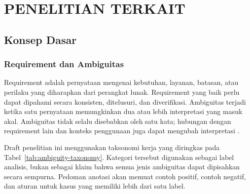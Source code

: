 \chapter{PENELITIAN TERKAIT}

\section{Konsep Dasar}

\subsection{Requirement dan Ambiguitas}

Requirement adalah pernyataan mengenai kebutuhan, layanan, batasan, atau perilaku yang diharapkan dari perangkat lunak. Requirement yang baik perlu dapat dipahami secara konsisten, ditelusuri, dan diverifikasi. Ambiguitas terjadi ketika satu pernyataan memungkinkan dua atau lebih interpretasi yang masuk akal. Ambiguitas tidak selalu disebabkan oleh satu kata; hubungan dengan requirement lain dan konteks penggunaan juga dapat mengubah interpretasi \cite{berry2000,kamsties1998}.

Draft penelitian ini menggunakan taksonomi kerja yang diringkas pada Tabel~\ref{tab:ambiguity-taxonomy}. Kategori tersebut digunakan sebagai label analisis, bukan sebagai klaim bahwa semua jenis ambiguitas dapat dipisahkan secara sempurna. Pedoman anotasi akan memuat contoh positif, contoh negatif, dan aturan untuk kasus yang memiliki lebih dari satu label.

